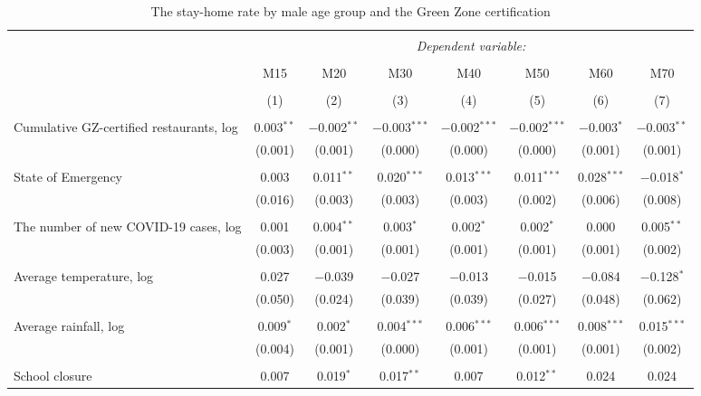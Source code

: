 
\begin{table}[H] \centering 
  \caption{The stay-home rate by male age group and the Green Zone certification} 
  \label{} 
\footnotesize 
\begin{tabular}{@{\extracolsep{-11pt}}lccccccc} 
\\[-1.8ex]\hline 
\hline \\[-1.8ex] 
 & \multicolumn{7}{c}{\textit{Dependent variable:}} \\ 
\cline{2-8} 
\\[-1.8ex] & M15 & M20 & M30 & M40 & M50 & M60 & M70 \\ 
\\[-1.8ex] & (1) & (2) & (3) & (4) & (5) & (6) & (7)\\ 
\hline \\[-1.8ex] 
 Cumulative GZ-certified restaurants, log & 0.003$^{**}$ & $-$0.002$^{**}$ & $-$0.003$^{***}$ & $-$0.002$^{***}$ & $-$0.002$^{***}$ & $-$0.003$^{*}$ & $-$0.003$^{**}$ \\ 
  & (0.001) & (0.001) & (0.000) & (0.000) & (0.000) & (0.001) & (0.001) \\ 
  & & & & & & & \\ 
 State of Emergency & 0.003 & 0.011$^{**}$ & 0.020$^{***}$ & 0.013$^{***}$ & 0.011$^{***}$ & 0.028$^{***}$ & $-$0.018$^{*}$ \\ 
  & (0.016) & (0.003) & (0.003) & (0.003) & (0.002) & (0.006) & (0.008) \\ 
  & & & & & & & \\ 
 The number of new COVID-19 cases, log & 0.001 & 0.004$^{**}$ & 0.003$^{*}$ & 0.002$^{*}$ & 0.002$^{*}$ & 0.000 & 0.005$^{**}$ \\ 
  & (0.003) & (0.001) & (0.001) & (0.001) & (0.001) & (0.001) & (0.002) \\ 
  & & & & & & & \\ 
 Average temperature, log & 0.027 & $-$0.039 & $-$0.027 & $-$0.013 & $-$0.015 & $-$0.084 & $-$0.128$^{*}$ \\ 
  & (0.050) & (0.024) & (0.039) & (0.039) & (0.027) & (0.048) & (0.062) \\ 
  & & & & & & & \\ 
 Average rainfall, log & 0.009$^{*}$ & 0.002$^{*}$ & 0.004$^{***}$ & 0.006$^{***}$ & 0.006$^{***}$ & 0.008$^{***}$ & 0.015$^{***}$ \\ 
  & (0.004) & (0.001) & (0.000) & (0.001) & (0.001) & (0.001) & (0.002) \\ 
  & & & & & & & \\ 
 School closure & 0.007 & 0.019$^{*}$ & 0.017$^{**}$ & 0.007 & 0.012$^{**}$ & 0.024 & 0.024 \\ 

\end{tabular}
\end{table}
